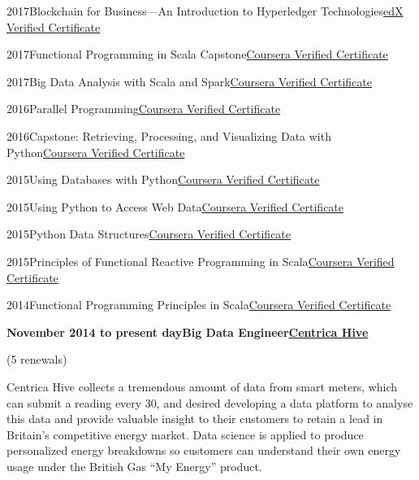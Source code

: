 \documentclass[a4paper,12pt]{article}
\newcommand{\head}[1]{\needspace{6em}\begin{center}{\large{\textbf{\sc{#1}}}}\nopagebreak\end{center}}
\newcommand{\clientwork}[3]{\textbf{#1\hfill#3\hfill#2}\nopagebreak}
\newcommand{\renewals}[1]{(#1 renewals)\nopagebreak}
\newcommand{\tab}{\hspace{2em}}
\newcommand{\education}[3]{#1\tab#2\hfill#3}
\begin{document}
\head{Certifications}

\education{2017}{Blockchain for Business---An Introduction to Hyperledger Technologies}{\href{https://courses.edx.org/certificates/de3424d0c11842f48fb2c79ddf1073c8}{edX Verified Certificate}}

\education{2017}{Functional Programming in Scala Capstone}{\href{https://www.coursera.org/account/accomplishments/verify/4F5MVWUN8MWZ}{Coursera Verified Certificate}}

\education{2017}{Big Data Analysis with Scala and Spark}{\href{https://www.coursera.org/account/accomplishments/verify/BT95Z35S6LVX}{Coursera Verified Certificate}}

\education{2016}{Parallel Programming}{\href{https://www.coursera.org/account/accomplishments/verify/CJ4JSLUQK73D}{Coursera Verified Certificate}}

\education{2016}{Capstone: Retrieving, Processing, and Visualizing Data with Python}{\href{https://www.coursera.org/account/accomplishments/verify/8MKC3G5RN9S3}{Coursera Verified Certificate}}

\education{2015}{Using Databases with Python}{\href{https://www.coursera.org/account/accomplishments/verify/JNESYEJ5FURJ}{Coursera Verified Certificate}}

\education{2015}{Using Python to Access Web Data}{\href{https://www.coursera.org/account/accomplishments/verify/BVY6EDX4Z2PM}{Coursera Verified Certificate}}

\education{2015}{Python Data Structures}{\href{https://www.coursera.org/account/accomplishments/verify/VHVY2836QWWS}{Coursera Verified Certificate}}

\education{2015}{Principles of Functional Reactive Programming in Scala}{\href{https://www.coursera.org/account/accomplishments/records/8jPph3vAjsWdaQeW}{Coursera Verified Certificate}}

\education{2014}{Functional Programming Principles in Scala}{\href{https://www.coursera.org/maestro/api/certificate/get_certificate?verify-code=87DZAXY7SA}{Coursera Verified Certificate}}

\head{Career History}

\clientwork{November 2014 to present day}{\href{https://www.hivehome.com}{Centrica Hive}}{Big Data Engineer}

\renewals{5}

Centrica Hive collects a tremendous amount of data from smart meters, which can submit a reading every 30, and desired developing a data platform to analyse this data and provide valuable insight to their customers to retain a lead in Britain’s competitive energy market. Data science is applied to produce personalized energy breakdowns so customers can understand their own energy usage under the British Gas “My Energy” product.\\
\end{document}
